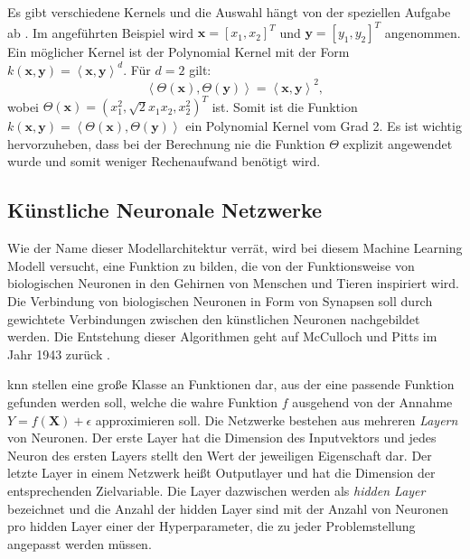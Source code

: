 Es gibt verschiedene Kernels und die Auswahl h\"angt von der speziellen Aufgabe ab \cite{SVM1}. Im angef\"uhrten Beispiel wird $ \mathbf{x} = [x_1, x_2]^T$ und $\mathbf{y} = [y_1, y_2]^T$ angenommen.
Ein m\"oglicher Kernel ist der Polynomial Kernel mit der Form
$k(\mathbf{x}, \mathbf{y}) = \left\langle \mathbf{x}, \mathbf{y} \right\rangle^d$. F\"ur $d=2$ gilt:
$$ \left\langle \Theta(\mathbf{x}), \Theta(\mathbf{y}) \right\rangle = \left\langle \mathbf{x}, \mathbf{y} \right\rangle^2, $$
wobei $\Theta(\mathbf{x}) = (x_1^2, \sqrt{2}x_1x_2, x_2^2)^T$ ist.
Somit ist die Funktion $k(\mathbf{x}, \mathbf{y}) = \left\langle \Theta(\mathbf{x}), \Theta(\mathbf{y}) \right\rangle$
ein Polynomial Kernel vom Grad 2. Es ist wichtig hervorzuheben, dass bei der Berechnung nie die Funktion $\Theta$ explizit angewendet wurde
und somit weniger Rechenaufwand ben\"otigt wird.































\subsection{K\"unstliche Neuronale Netzwerke}
Wie der Name dieser Modellarchitektur verr\"at, wird bei diesem Machine Learning Modell versucht, eine Funktion zu bilden, die von der Funktionsweise
von biologischen Neuronen in den Gehirnen von Menschen und Tieren inspiriert wird. Die Verbindung von biologischen Neuronen in Form von Synapsen soll durch gewichtete
Verbindungen zwischen den k\"unstlichen Neuronen nachgebildet werden. Die Entstehung dieser Algorithmen
geht auf McCulloch und Pitts im Jahr 1943 zur\"uck \cite{McCulloch}.

\gls{knn} stellen eine gro{\ss}e Klasse an Funktionen dar, aus der eine passende Funktion gefunden werden soll, welche
die wahre Funktion $f$ ausgehend von der Annahme $Y = f(\mathbf{X}) + \epsilon$ approximieren soll. Die Netzwerke bestehen aus mehreren \textit{Layern} von Neuronen. Der erste Layer hat
die Dimension des Inputvektors und jedes Neuron des ersten Layers stellt den Wert der jeweiligen Eigenschaft dar. Der letzte Layer in einem Netzwerk hei{\ss}t
Outputlayer und hat die Dimension der entsprechenden Zielvariable. Die Layer dazwischen werden als \textit{hidden Layer} bezeichnet und die Anzahl der hidden Layer sind mit der Anzahl von Neuronen pro
hidden Layer einer der Hyperparameter, die zu jeder Problemstellung angepasst werden m\"ussen.

